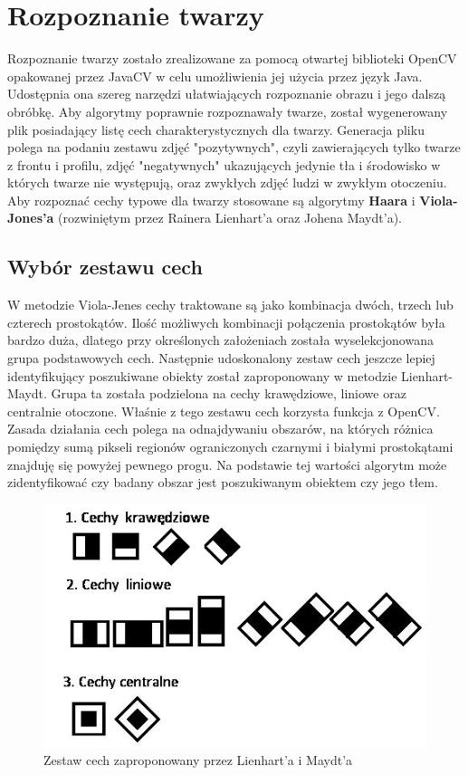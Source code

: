 \section{Rozpoznanie twarzy}
Rozpoznanie twarzy zostało zrealizowane za pomocą otwartej biblioteki OpenCV opakowanej przez JavaCV w celu umożliwienia jej użycia przez język Java. Udostępnia ona szereg narzędzi ułatwiających rozpoznanie obrazu i jego dalszą obróbkę. Aby algorytmy poprawnie rozpoznawały twarze, został wygenerowany plik posiadający listę cech charakterystycznych dla twarzy. Generacja pliku polega na podaniu zestawu zdjęć "pozytywnych", czyli zawierających tylko twarze z frontu i profilu, zdjęć "negatywnych" ukazujących jedynie tła i środowisko w których twarze nie występują, oraz zwykłych zdjęć ludzi w zwykłym otoczeniu. 
Aby rozpoznać cechy typowe dla twarzy stosowane są algorytmy \textbf{Haara} i \textbf{Viola-Jones'a} (rozwiniętym przez Rainera Lienhart'a oraz Johena Maydt’a).

\subsection{Wybór zestawu cech}
W metodzie Viola-Jenes cechy traktowane są jako kombinacja dwóch, trzech lub czterech prostokątów. Ilość możliwych kombinacji połączenia prostokątów była bardzo duża, dlatego przy określonych założeniach została wyselekcjonowana grupa podstawowych cech. Następnie udoskonalony zestaw cech jeszcze lepiej identyfikujący poszukiwane obiekty został zaproponowany w metodzie Lienhart-Maydt. Grupa ta została podzielona na cechy krawędziowe, liniowe oraz centralnie otoczone. Właśnie z tego zestawu cech korzysta funkcja z OpenCV. Zasada działania cech polega na odnajdywaniu obszarów, na których różnica pomiędzy sumą pikseli regionów ograniczonych czarnymi i białymi prostokątami znajduję się powyżej pewnego progu. Na podstawie tej wartości algorytm może zidentyfikować czy badany obszar jest poszukiwanym obiektem czy jego tłem.

\begin{figure}[h]
\centering
\includegraphics[scale=0.6]{./violajones.jpg}
\caption[Cechy rozpoznawane przez OpenCV]{Zestaw cech zaproponowany przez Lienhart'a i Maydt'a}
\end{figure}

